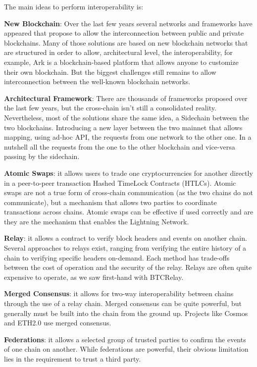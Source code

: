 The main ideas to perform interoperability is:

\begin{outline}
    \1 \textbf{New Blockchain}: Over the last few years several networks and frameworks have appeared that propose to 
    allow the interconnection between public and private blockchains. Many of those solutions are based on new 
    blockchain networks that are structured in order to allow, architectural level, the interoperability, for 
    example, Ark\cite{ark} is a blockchain-based platform that allows anyone to customize their own blockchain. But 
    the biggest challenges still remains to allow interconnection between the well-known blockchain 
    networks. 

    \1 \textbf{Architectural Framework}: There are thousands of frameworks proposed over the last few years, but 
    the cross-chain isn't still a consolidated reality. Nevertheless, most of the solutions share the same idea, a 
    Sidechain\cite{sidechain} between the two blockchains. Introducing a new layer between the two mainnet that allows 
    mapping, using ad-hoc API, the requests from one network to the other one. In a nutshell all the requests 
    from the one to the other blockchain and vice-versa passing by the sidechain.\cite{atomic-crosschain} \cite{iot-crosschain}

    \1 \textbf{Atomic Swaps}\cite{atomic-swap}: it allows users to trade one cryptocurrencies for another directly in a peer-to-peer 
    transaction Hashed TimeLock Contracts (HTLCs)\cite{HTLC}. Atomic swaps are not a true form of cross-chain 
    communication (as the two chains do not communicate), but a mechanism that allows two parties to 
    coordinate transactions across chains. Atomic swaps can be effective if used correctly and are they are the 
    mechanism that enables the Lightning Network\cite{lightning}.

    \1 \textbf{Relay}: it allows a contract to verify block headers and events on another chain. Several 
    approaches to relays exist, ranging from verifying the entire history of a chain to verifying specific 
    headers on-demand. Each method has trade-offs between the cost of operation and the security of the relay. 
    Relays are often quite expensive to operate, as we saw first-hand with BTCRelay\cite{relay}.

    \1 \textbf{Merged Consensus}: it allows for two-way interoperability between chains through the use of a relay 
    chain. Merged consensus can be quite powerful, but generally must be built into the chain from the ground 
    up. Projects like Cosmos\cite{cosmos} and ETH2.0\cite{eth2} 
    use merged consensus.

    \1 \textbf{Federations}: it allows a selected group of trusted parties to confirm the events of one chain on 
    another. While federations are powerful, their obvious limitation lies in the requirement to trust a 
    third party.

\end{outline}

